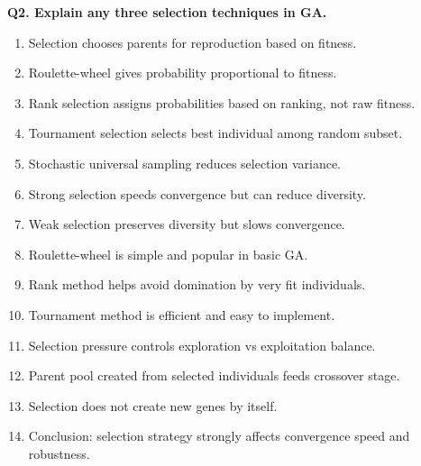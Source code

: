 \documentclass[11pt,a4paper]{article}
\begin{document}
\textbf{Q2. Explain any three selection techniques in GA.}
\begin{enumerate}
\item Selection chooses parents for reproduction based on fitness.
\item Roulette-wheel gives probability proportional to fitness.
\item Rank selection assigns probabilities based on ranking, not raw fitness.
\item Tournament selection selects best individual among random subset.
\item Stochastic universal sampling reduces selection variance.
\item Strong selection speeds convergence but can reduce diversity.
\item Weak selection preserves diversity but slows convergence.
\item Roulette-wheel is simple and popular in basic GA.
\item Rank method helps avoid domination by very fit individuals.
\item Tournament method is efficient and easy to implement.
\item Selection pressure controls exploration vs exploitation balance.
\item Parent pool created from selected individuals feeds crossover stage.
\item Selection does not create new genes by itself.
\item Conclusion: selection strategy strongly affects convergence speed and robustness.
\end{enumerate}
\end{document}
